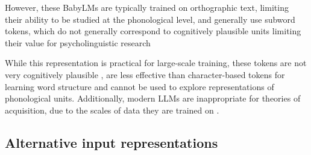 However, these BabyLMs are typically trained on orthographic text, limiting their ability to be studied at the phonological level, and generally use subword tokens, which do not generally correspond to cognitively plausible units \citep{beinborn-pinter-2023-analyzing} limiting their value for psycholinguistic research \citep{giulianelli-etal-2024-proper}


While this representation is practical for large-scale training, these tokens are not very cognitively plausible \citep{beinborn-pinter-2023-analyzing}, are less effective than character-based tokens for learning word structure \citep{bunzeck2025subwordmodelsstruggleword} and cannot be used to explore representations of phonological units. Additionally, modern LLMs are inappropriate for theories of acquisition, due to the scales of data they are trained on \citep{warstadt-2023-babylm-findings}.

\subsection{Alternative input representations}




